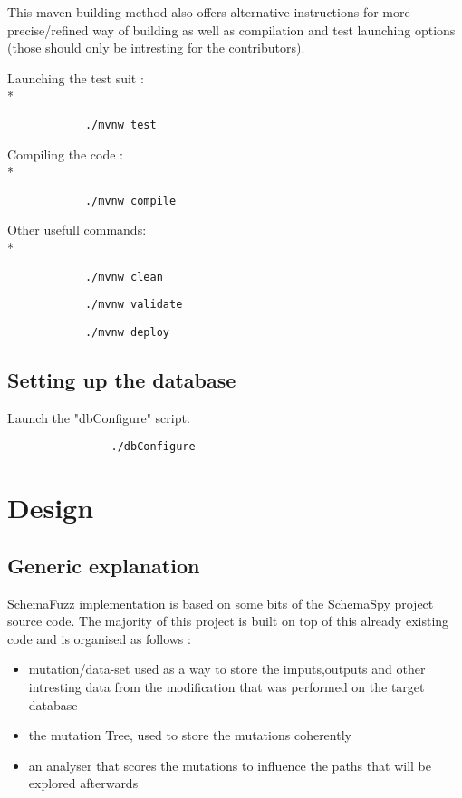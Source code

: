 \documentclass{article}
\begin{document}
\begin{empfile}
This maven building method also offers alternative instructions for 	more precise/refined way of building as well as compilation and test 
launching options (those should only be intresting for the contributors).

Launching the test suit :\\*
			\begin{verbatim}
			./mvnw test
			\end{verbatim}
Compiling the code :\\*		
			\begin{verbatim}
			./mvnw compile
			\end{verbatim}
		
Other usefull commands: \\*		
		
			\begin{verbatim}
			./mvnw clean
			\end{verbatim}
			\begin{verbatim}
			./mvnw validate
			\end{verbatim}
			\begin{verbatim}
			./mvnw deploy
			\end{verbatim}
		
		\subsection{Setting up the database}	
	
Launch the "dbConfigure" script.
			\begin{verbatim}
				./dbConfigure
			\end{verbatim}		 
	
	\section{Design}
		\subsection{Generic explanation}
SchemaFuzz implementation is based on some bits of the SchemaSpy project source code.
The majority of this project is built on top of this already existing code and is organised as follows :
		\begin{itemize}
		\item{mutation/data-set used as a way to store the imputs,outputs and other intresting data from the modification that was performed on the target database}
		\item{the mutation Tree, used to store the mutations coherently}
		\item{an analyser that scores the mutations to influence the paths that will be explored afterwards}
		\end{itemize}
		 

\end{empfile}
\end{document}
